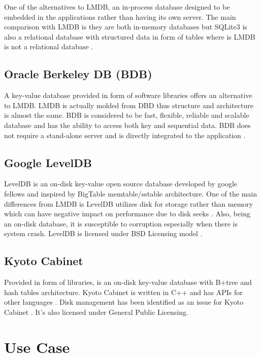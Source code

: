 \documentclass[9pt,twocolumn,twoside]{styles/osajnl}
\begin{document}
One of the alternatives to LMDB, an in-process database designed to be
embedded in the applications rather than having its own server. The
main comparison with LMDB is they are both in-memory databases but
SQLite3 is also a relational database with structured data in form of
tables where is LMDB is not a relational database \cite{www-sqlite}.

\subsection{Oracle Berkeley DB (BDB)}

A key-value database provided in form of software libraries offers an
alternative to LMDB. LMDB is actually molded from DBD thus structure
and architecture is almost the same. BDB is considered to be fast,
flexible, reliable and scalable database and has the ability to access
both key and sequential data. BDB does not require a stand-alone
server and is directly integrated to the application \cite{www-bdb}.

\subsection{Google LevelDB}

LevelDB is an on-disk key-value open source database developed by
google fellows and inspired by BigTable memtable/sstable
architecture. One of the main differences from LMDB is LevelDB
utilizes disk for storage rather than memory which can have negative
impact on performance due to disk seeks \cite{www-riak}. Also, being
an on-disk database, it is susceptible to corruption especially when
there is system crash. LevelDB is licensed under BSD Licensing model
\cite{www-leveldb}.

\subsection{Kyoto Cabinet}

Provided in form of libraries, is an on-disk key-value database with
B+tree and hash tables architecture. Kyoto Cabinet is written in C++
and has APIs for other languages \cite{www-fallabs}. Disk management
has been identified as an issue for Kyoto Cabinet
\cite{www-kyoto}. It’s also licensed under General Public Licensing.

\section{Use Case}
\end{document}

